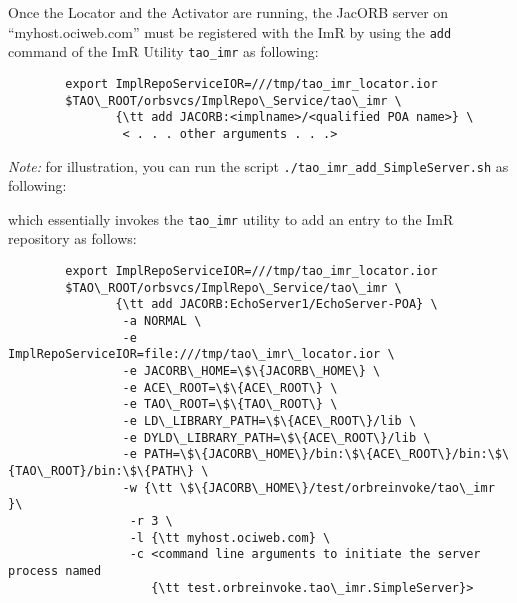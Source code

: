 Once the Locator and the Activator are running, the JacORB server on
“myhost.ociweb.com” must be registered with the ImR by using the
{\tt add} command of the ImR Utility {\tt tao\_imr} as following:

\begin{verbatim}
        export ImplRepoServiceIOR=///tmp/tao_imr_locator.ior
        $TAO\_ROOT/orbsvcs/ImplRepo\_Service/tao\_imr \
               {\tt add JACORB:<implname>/<qualified POA name>} \
                < . . . other arguments . . .>
\end{verbatim}

\emph{Note:} for illustration, you can run the script
{\tt ./tao\_imr\_add\_SimpleServer.sh} as following:


which essentially invokes the {\tt tao\_imr} utility to add an entry to
the ImR repository as follows:

\begin{verbatim}
        export ImplRepoServiceIOR=///tmp/tao_imr_locator.ior
        $TAO\_ROOT/orbsvcs/ImplRepo\_Service/tao\_imr \
               {\tt add JACORB:EchoServer1/EchoServer-POA} \
                -a NORMAL \
                -e ImplRepoServiceIOR=file:///tmp/tao\_imr\_locator.ior \
                -e JACORB\_HOME=\$\{JACORB\_HOME\} \
                -e ACE\_ROOT=\$\{ACE\_ROOT\} \
                -e TAO\_ROOT=\$\{TAO\_ROOT\} \
                -e LD\_LIBRARY_PATH=\$\{ACE\_ROOT\}/lib \
                -e DYLD\_LIBRARY_PATH=\$\{ACE\_ROOT\}/lib \
                -e PATH=\$\{JACORB\_HOME\}/bin:\$\{ACE\_ROOT\}/bin:\$\{TAO\_ROOT}/bin:\$\{PATH\} \
                -w {\tt \$\{JACORB\_HOME\}/test/orbreinvoke/tao\_imr }\
                 -r 3 \
                 -l {\tt myhost.ociweb.com} \
                 -c <command line arguments to initiate the server process named
                    {\tt test.orbreinvoke.tao\_imr.SimpleServer}>
\end{verbatim}

